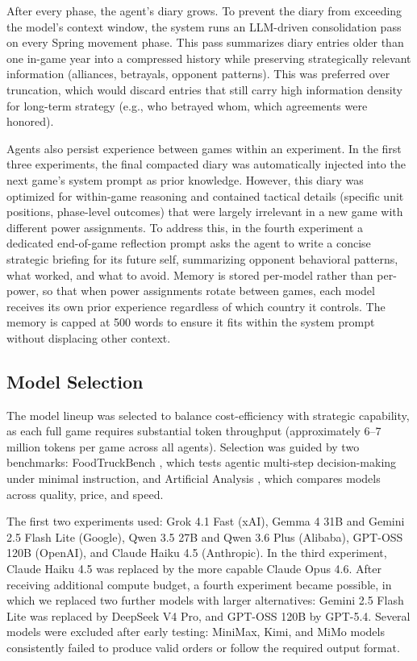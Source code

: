 \documentclass[a4paper,oneside,bibliography=totoc]{scrartcl}
\begin{document}
After every phase, the agent's diary grows. To prevent the diary from exceeding the model's context window, the system runs an LLM-driven consolidation pass on every Spring movement phase. This pass summarizes diary entries older than one in-game year into a compressed history while preserving strategically relevant information (alliances, betrayals, opponent patterns). This was preferred over truncation, which would discard entries that still carry high information density for long-term strategy (e.g., who betrayed whom, which agreements were honored).

Agents also persist experience between games within an experiment. In the first three experiments, the final compacted diary was automatically injected into the next game's system prompt as prior knowledge. However, this diary was optimized for within-game reasoning and contained tactical details (specific unit positions, phase-level outcomes) that were largely irrelevant in a new game with different power assignments. To address this, in the fourth experiment a dedicated end-of-game reflection prompt asks the agent to write a concise strategic briefing for its future self, summarizing opponent behavioral patterns, what worked, and what to avoid. Memory is stored per-model rather than per-power, so that when power assignments rotate between games, each model receives its own prior experience regardless of which country it controls. The memory is capped at 500 words to ensure it fits within the system prompt without displacing other context.

\subsection{Model Selection}

The model lineup was selected to balance cost-efficiency with strategic capability, as each full game requires substantial token throughput (approximately 6--7 million tokens per game across all agents). Selection was guided by two benchmarks: FoodTruckBench \cite{foodtruckbench2025}, which tests agentic multi-step decision-making under minimal instruction, and Artificial Analysis \cite{artificialanalysis2025}, which compares models across quality, price, and speed.

The first two experiments used: Grok 4.1 Fast (xAI), Gemma 4 31B and Gemini 2.5 Flash Lite (Google), Qwen 3.5 27B and Qwen 3.6 Plus (Alibaba), GPT-OSS 120B (OpenAI), and Claude Haiku 4.5 (Anthropic). In the third experiment, Claude Haiku 4.5 was replaced by the more capable Claude Opus 4.6. After receiving additional compute budget, a fourth experiment became possible, in which we replaced two further models with larger alternatives: Gemini 2.5 Flash Lite was replaced by DeepSeek V4 Pro, and GPT-OSS 120B by GPT-5.4. Several models were excluded after early testing: MiniMax, Kimi, and MiMo models consistently failed to produce valid orders or follow the required output format.
\end{document}
